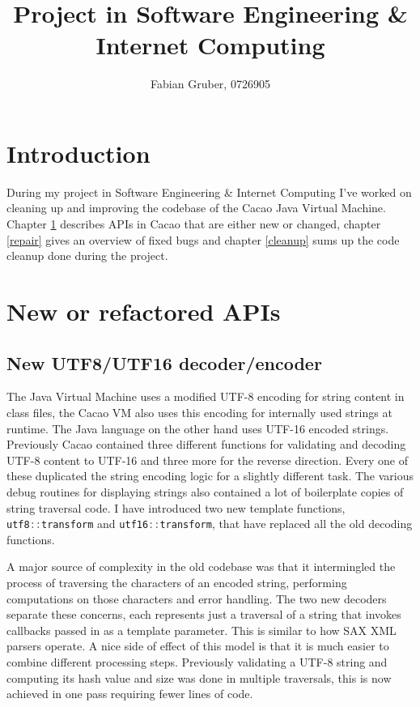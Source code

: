 \documentclass[12pt,a4paper,oneside]{article}
\newcommand{\cpp}[1]{\lstinline[language=C++]{#1}}
\begin{document}
	\title{Project in Software Engineering \& Internet Computing }
	\author{Fabian Gruber, 0726905}

	\maketitle

\section*{Introduction}
	During my project in Software Engineering \& Internet Computing I've worked on cleaning up and improving the codebase of the
	Cacao Java Virtual Machine.
	Chapter \ref{new_apis} describes APIs in Cacao that are either new or changed,
	chapter \ref{repair} gives an overview of fixed bugs and
	chapter \ref{cleanup} sums up the code cleanup done during the project.

\section{New or refactored APIs}
\label{new_apis}

\subsection{New UTF8/UTF16 decoder/encoder}
	The Java Virtual Machine uses a modified UTF-8 encoding\cite{jvmutf8} for string content in class files,
	the Cacao VM also uses this encoding for internally used strings at runtime.
	The Java language on the other hand uses UTF-16 encoded strings.
	Previously Cacao contained three different functions for validating and decoding UTF-8 content to UTF-16
	and three more for the reverse direction.
	Every one of these duplicated the string encoding logic for a slightly different task.
	The various debug routines for displaying strings also contained a lot of boilerplate copies of string traversal code.
	I have introduced two new template functions, \cpp{utf8::transform} and \cpp{utf16::transform}, that have replaced all the old decoding functions.

	A major source of complexity in the old codebase was that it intermingled the process of traversing the characters of an
	encoded string, performing computations on those characters and error handling.
	The two new decoders separate these concerns, each represents just a traversal of a string that invokes
	callbacks passed in as a template parameter. This is similar to how SAX XML parsers operate.
	A nice side of effect of this model is that it is much easier to combine different processing steps.
	Previously validating a UTF-8 string and computing its hash value and size was done in multiple traversals,
	this is now achieved in one pass requiring fewer lines of code.
\end{document}
